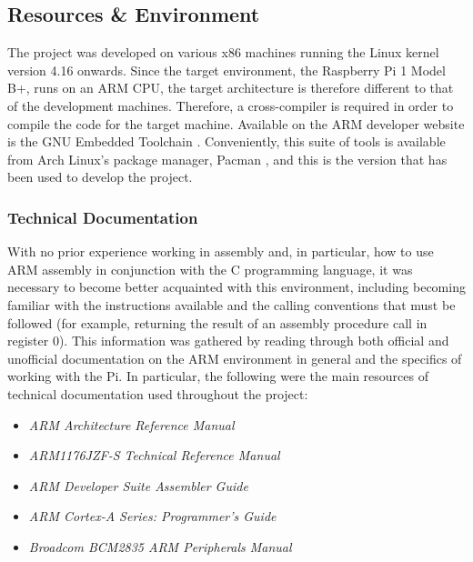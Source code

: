 \subsection{Resources \& Environment}
    The project was developed on various x86 machines running the Linux kernel
    version 4.16 onwards. Since the target environment, the Raspberry Pi 1 Model
    B+, runs on an ARM CPU, the target architecture is therefore different to
    that of the development machines. Therefore, a cross-compiler is required in
    order to compile the code for the target machine. Available on the ARM
    developer website is the GNU Embedded Toolchain \cite{GNUToolchain}.
    Conveniently, this suite of tools is available from Arch Linux's package
    manager, Pacman \cite{PacmanEABI}, and this is the version that has been
    used to develop the project.

    \subsubsection{Technical Documentation}
        With no prior experience working in assembly and, in particular, how to
        use ARM assembly in conjunction with the C programming language, it was
        necessary to become better acquainted with this environment, including
        becoming familiar with the instructions available and the calling
        conventions that must be followed (for example, returning the result of
        an assembly procedure call in register 0). This information was gathered
        by reading through both official and unofficial documentation on the ARM
        environment in general and the specifics of working with the Pi. In
        particular, the following were the main resources of technical
        documentation used throughout the project:
        \begin{itemize}
            \itemsep0em 
            \item \textit{ARM Architecture Reference Manual} \cite{ARMARM}
            \item \textit{ARM1176JZF-S Technical Reference Manual} \cite{TRM}
            \item \textit{ARM Developer Suite Assembler Guide}
                \cite{OnlineARMGuide}
            \item \textit{ARM Cortex-A Series: Programmer's Guide}
                \cite{ProgrammersGuide}
            \item \textit{Broadcom BCM2835 ARM Peripherals Manual} \cite{BCM2835}
        \end{itemize}

